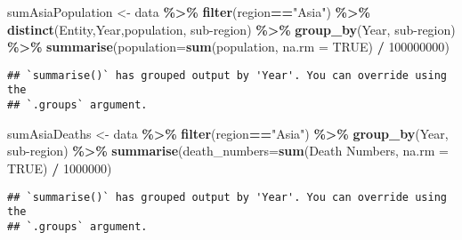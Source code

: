\documentclass[
]{article}
\newenvironment{Shaded}{\begin{snugshade}}{\end{snugshade}}
\newcommand{\AttributeTok}[1]{\textcolor[rgb]{0.13,0.29,0.53}{#1}}
\newcommand{\ConstantTok}[1]{\textcolor[rgb]{0.56,0.35,0.01}{#1}}
\newcommand{\DecValTok}[1]{\textcolor[rgb]{0.00,0.00,0.81}{#1}}
\newcommand{\FunctionTok}[1]{\textcolor[rgb]{0.13,0.29,0.53}{\textbf{#1}}}
\newcommand{\NormalTok}[1]{#1}
\newcommand{\OtherTok}[1]{\textcolor[rgb]{0.56,0.35,0.01}{#1}}
\newcommand{\SpecialCharTok}[1]{\textcolor[rgb]{0.81,0.36,0.00}{\textbf{#1}}}
\newcommand{\StringTok}[1]{\textcolor[rgb]{0.31,0.60,0.02}{#1}}
\begin{document}
\begin{Shaded}
\begin{Highlighting}[]
\NormalTok{sumAsiaPopulation }\OtherTok{\textless{}{-}}\NormalTok{ data }\SpecialCharTok{\%\textgreater{}\%} 
  \FunctionTok{filter}\NormalTok{(region}\SpecialCharTok{==}\StringTok{"Asia"}\NormalTok{) }\SpecialCharTok{\%\textgreater{}\%}
  \FunctionTok{distinct}\NormalTok{(Entity,Year,population, }\StringTok{\textasciigrave{}}\AttributeTok{sub{-}region}\StringTok{\textasciigrave{}}\NormalTok{) }\SpecialCharTok{\%\textgreater{}\%}
  \FunctionTok{group\_by}\NormalTok{(Year, }\StringTok{\textasciigrave{}}\AttributeTok{sub{-}region}\StringTok{\textasciigrave{}}\NormalTok{) }\SpecialCharTok{\%\textgreater{}\%}
  \FunctionTok{summarise}\NormalTok{(}\AttributeTok{population=}\FunctionTok{sum}\NormalTok{(population, }\AttributeTok{na.rm =} \ConstantTok{TRUE}\NormalTok{) }\SpecialCharTok{/} \DecValTok{100000000}\NormalTok{)}
\end{Highlighting}
\end{Shaded}

\begin{verbatim}
## `summarise()` has grouped output by 'Year'. You can override using the
## `.groups` argument.
\end{verbatim}

\begin{Shaded}
\begin{Highlighting}[]
\NormalTok{sumAsiaDeaths }\OtherTok{\textless{}{-}}\NormalTok{ data }\SpecialCharTok{\%\textgreater{}\%}
  \FunctionTok{filter}\NormalTok{(region}\SpecialCharTok{==}\StringTok{"Asia"}\NormalTok{) }\SpecialCharTok{\%\textgreater{}\%} 
  \FunctionTok{group\_by}\NormalTok{(Year, }\StringTok{\textasciigrave{}}\AttributeTok{sub{-}region}\StringTok{\textasciigrave{}}\NormalTok{) }\SpecialCharTok{\%\textgreater{}\%}
  \FunctionTok{summarise}\NormalTok{(}\AttributeTok{death\_numbers=}\FunctionTok{sum}\NormalTok{(}\StringTok{\textasciigrave{}}\AttributeTok{Death Numbers}\StringTok{\textasciigrave{}}\NormalTok{, }\AttributeTok{na.rm =} \ConstantTok{TRUE}\NormalTok{) }\SpecialCharTok{/} \DecValTok{1000000}\NormalTok{)}
\end{Highlighting}
\end{Shaded}

\begin{verbatim}
## `summarise()` has grouped output by 'Year'. You can override using the
## `.groups` argument.
\end{verbatim}
\end{document}
